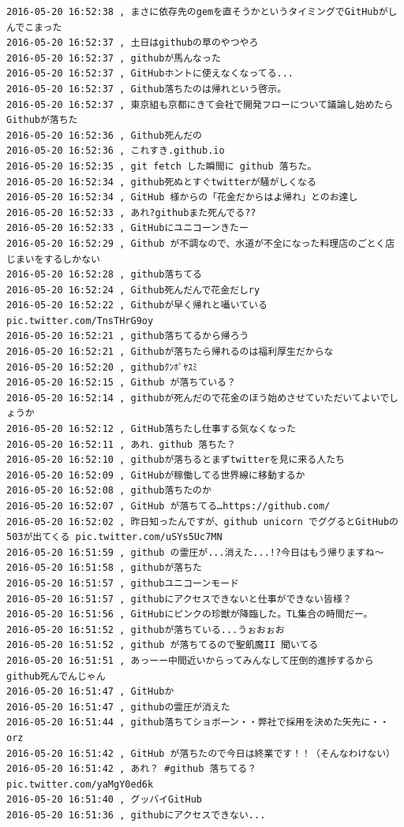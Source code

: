 \begin{verbatim}
2016-05-20 16:52:38 , まさに依存先のgemを直そうかというタイミングでGitHubがしんでこまった
2016-05-20 16:52:37 , 土日はgithubの草のやつやろ
2016-05-20 16:52:37 , githubが馬んなった
2016-05-20 16:52:37 , GitHubホントに使えなくなってる...
2016-05-20 16:52:37 , Github落ちたのは帰れという啓示。
2016-05-20 16:52:37 , 東京組も京都にきて会社で開発フローについて議論し始めたらGithubが落ちた
2016-05-20 16:52:36 , Github死んだの
2016-05-20 16:52:36 , これすき.github.io
2016-05-20 16:52:35 , git fetch した瞬間に github 落ちた。
2016-05-20 16:52:34 , github死ぬとすぐtwitterが騒がしくなる
2016-05-20 16:52:34 , GitHub 様からの「花金だからはよ帰れ」とのお達し
2016-05-20 16:52:33 , あれ?githubまた死んでる??
2016-05-20 16:52:33 , GitHubにユニコーンきたー
2016-05-20 16:52:29 , Github が不調なので、水道が不全になった料理店のごとく店じまいをするしかない
2016-05-20 16:52:28 , github落ちてる
2016-05-20 16:52:24 , Github死んだんで花金だしry
2016-05-20 16:52:22 , Githubが早く帰れと囁いている pic.twitter.com/TnsTHrG9oy
2016-05-20 16:52:21 , github落ちてるから帰ろう
2016-05-20 16:52:21 , Githubが落ちたら帰れるのは福利厚生だからな
2016-05-20 16:52:20 , githubｸﾝﾎﾟﾔｽﾐ
2016-05-20 16:52:15 , Github が落ちている？
2016-05-20 16:52:14 , githubが死んだので花金のほう始めさせていただいてよいでしょうか
2016-05-20 16:52:12 , GitHub落ちたし仕事する気なくなった
2016-05-20 16:52:11 , あれ．github 落ちた？
2016-05-20 16:52:10 , githubが落ちるとまずtwitterを見に来る人たち
2016-05-20 16:52:09 , GitHubが稼働してる世界線に移動するか
2016-05-20 16:52:08 , github落ちたのか
2016-05-20 16:52:07 , GitHub が落ちてる…https://github.com/ 
2016-05-20 16:52:02 , 昨日知ったんですが、github unicorn でググるとGitHubの503が出てくる pic.twitter.com/uSYs5Uc7MN
2016-05-20 16:51:59 , github の霊圧が...消えた...!?今日はもう帰りますね〜
2016-05-20 16:51:58 , githubが落ちた
2016-05-20 16:51:57 , githubユニコーンモード
2016-05-20 16:51:57 , githubにアクセスできないと仕事ができない皆様？
2016-05-20 16:51:56 , GitHubにピンクの珍獣が降臨した。TL集合の時間だー。
2016-05-20 16:51:52 , githubが落ちている...うぉおぉお
2016-05-20 16:51:52 , github が落ちてるので聖飢魔II 聞いてる
2016-05-20 16:51:51 , あっーー中間近いからってみんなして圧倒的進捗するからgithub死んでんじゃん
2016-05-20 16:51:47 , GitHubか
2016-05-20 16:51:47 , githubの霊圧が消えた
2016-05-20 16:51:44 , github落ちてショボーン・・弊社で採用を決めた矢先に・・orz
2016-05-20 16:51:42 , GitHub が落ちたので今日は終業です！！（そんなわけない）
2016-05-20 16:51:42 , あれ？ #github 落ちてる？ pic.twitter.com/yaMgY0ed6k
2016-05-20 16:51:40 , グッバイGitHub
2016-05-20 16:51:36 , githubにアクセスできない...

\end{verbatim}
